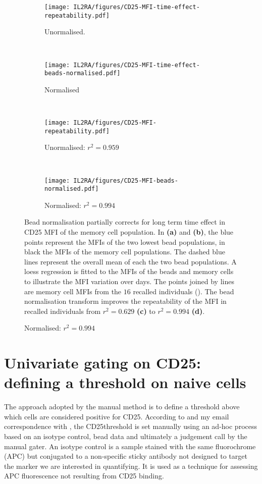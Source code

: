 \begin{figure}[ht]
\centering
\begin{subfigure}[b]{.4\textwidth}
    \centering
    \texttt{[image: IL2RA/figures/CD25-MFI-time-effect-repeatability.pdf]}
    \caption{Unormalised.}
\end{subfigure}
~
\begin{subfigure}[b]{.4\textwidth}
    \centering
    \texttt{[image: IL2RA/figures/CD25-MFI-time-effect-beads-normalised.pdf]}
    \caption{Normalised}
\end{subfigure}
~
\begin{subfigure}[b]{.4\textwidth}
    \centering
    \texttt{[image: IL2RA/figures/CD25-MFI-repeatability.pdf]}
    \caption{Unormalised: $r^2=0.959$}
\end{subfigure}
~
\begin{subfigure}[b]{.4\textwidth}
    \centering
    \texttt{[image: IL2RA/figures/CD25-MFI-beads-normalised.pdf]}
    \caption{Normalised: $r^2=0.994$}
\end{subfigure}
{Bead normalisation partially corrects for long term time effect in CD25 MFI of the memory cell population.}
{
  In \textbf{(a)} and \textbf{(b)}, the blue points represent the  MFIs of the two lowest bead populations,
  in black the  MFIs of the memory cell populations.
  The dashed blue lines represent the overall mean of each the two bead populations.
  A loess regression is fitted to the MFIs of the beads and memory cells to illustrate the MFI variation over days.
  The points joined by lines are memory cell  MFIs from the $16$ recalled individuals ().
  The bead normalisation transform  improves the repeatability of the MFI in recalled individuals from $r^2=0.629$ \textbf{(c)} to $r^2=0.994$ \textbf{(d)}.
}
\end{figure}




\section{Univariate gating on CD25: defining a \positive threshold on naive cells}

The approach adopted by the manual method is to define a threshold above which cells are considered positive for CD25.
According to \citet{Dendrou:2009dv} and my email correspondence with ,
the CD25\positive threshold is set manually using an ad-hoc process based on an isotype control, bead data and ultimately a judgement call
by the manual gater.
An isotype control is a sample stained with the same fluorochrome (APC) but conjugated to a
non-specific sticky antibody not designed to target the marker we are interested in quantifying.
It is used as a technique for assessing APC fluorescence not resulting from CD25 binding.


